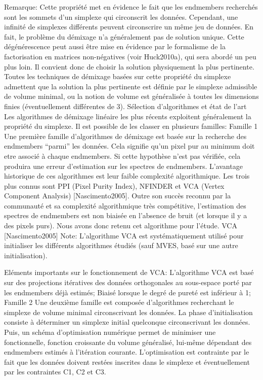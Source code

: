 Remarque: Cette propriété met en évidence le fait que les endmembers
recherchés sont les sommets d'un simplexe qui circonscrit les
données. Cependant, une infinité de simplexes différents peuvent
circonscrire un même jeu de données. En fait, le problème du démixage
n'a généralement pas de solution unique. Cette dégénérescence peut
aussi être mise en évidence par le formalisme de la factorisation en
matrices non-négatives (voir Huck2010a), qui sera abordé un peu plus
loin. Il convient donc de choisir la solution physiquement la plus
pertinente. Toutes les techniques de démixage basées sur cette
propriété du simplexe admettent que la solution la plus pertinente est
définie par le simplexe admissible de volume minimal, ou la notion de
volume est généralisée à toutes les dimensions finies (éventuellement
différentes de 3).  Sélection d'algorithmes et état de l'art Les
algorithmes de démixage linéaire les plus récents exploitent
généralement la propriété du simplexe. Il est possible de les classer
en plusieurs familles: 
Famille 1 Une première famille d'algorithmes
de démixage est basée sur la recherche des endmembers ``parmi'' les
données. Cela signifie qu'un pixel pur au minimum doit etre associé à
chaque endmembers. Si cette hypothèse n'est pas vérifiée, cela
produira une erreur d'estimation sur les spectres de
endmembers. L'avantage historique de ces algorithmes est leur faible
complexité algorithmique. Les trois plus connus sont PPI (Pixel Purity
Index), NFINDER et VCA (Vertex Component Analysis)
[Nascimento2005]. Outre son succès reconnu par la communauté et sa
complexité algorithmique très compétitive, l'estimation des spectres
de endmembers est non biaisée en l'absence de bruit (et lorsque il y a
des pixels purs). Nous avons donc retenu cet algorithme pour l'étude.
VCA [Nascimento2005] 
Note: L'algorithme VCA est systématiquement
utilisé pour initialiser les différents algorithmes étudiés (sauf
MVES, basé sur une autre initialisation).

Eléments importants sur le fonctionnement de VCA: L'algorithme VCA
est basé sur des projections itératives des données orthogonales au
sous-espace porté par les endmembers déjà estimés; Biaisé lorsque le
degré de pureté est inférieur à 1; Famille 2 Une deuxième famille est
composée d'algorithmes recherchant le simplexe de volume minimal
circonscrivant les données. La phase d'initialisation consiste à
déterminer un simplexe initial quelconque circonscrivant les
données. Puis, un schéma d'optimisation numérique permet de minimiser
une fonctionnelle, fonction croissante du volume généralisé, lui-même
dépendant des endmembers estimés à l'itération
courante. L'optimisation est contrainte par le fait que les données
doivent restées inscrites dans le simplexe et éventuellement par les
contraintes C1, C2 et C3.

